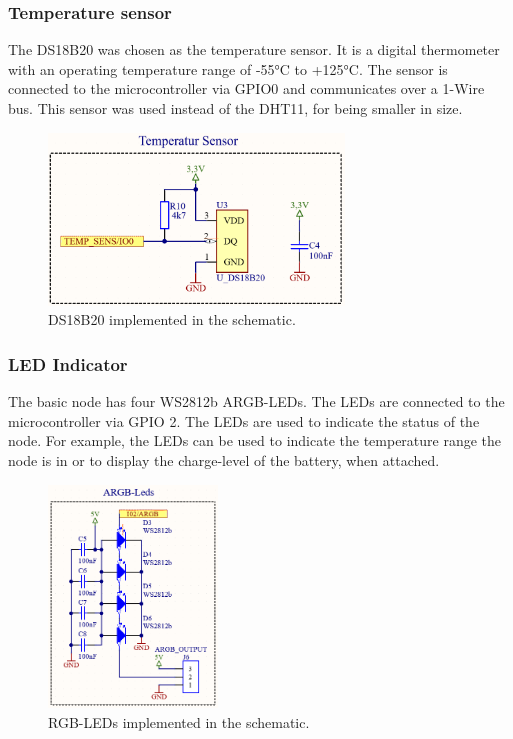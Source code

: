     \subsubsection{Temperature sensor}
        The DS18B20 was chosen as the temperature sensor. It is a digital thermometer
        with an operating temperature range of -55°C to +125°C. The sensor is connected
        to the microcontroller via GPIO0 and communicates over a 1-Wire bus.
        This sensor was used instead of the DHT11, for being smaller in size.

        \begin{figure}[H]
            \centering
            \includegraphics[width=0.7\textwidth]{assets/HW/DS18B20-schematic.png}
            \caption{DS18B20 implemented in the schematic.}
        \end{figure}

    \subsubsection{LED Indicator}
        The basic node has four WS2812b ARGB-LEDs. The LEDs are connected to the 
        microcontroller via GPIO 2. The LEDs are used to indicate the status of the node. 
        For example, the LEDs can be used to indicate the temperature range the node is in
        or to display the charge-level of the battery, when attached.

        \begin{figure}[H]
            \centering
            \includegraphics[width=0.4\textwidth]{assets/HW/RGB-LED-schematic.png}
            \caption{RGB-LEDs implemented in the schematic.}
        \end{figure}

